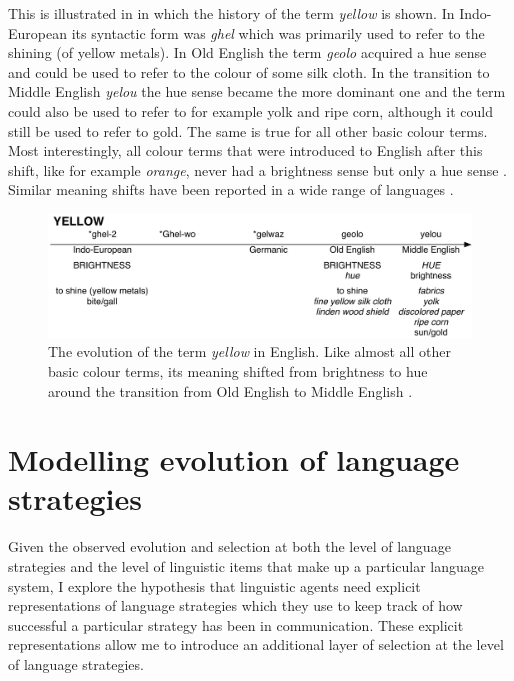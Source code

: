This is illustrated in  in which the
history of the term \textit{yellow} is shown. In Indo-European its
syntactic form was \textit{ghel} which was primarily used to refer to the
shining (of yellow metals). In Old English the term \textit{geolo} acquired
a hue sense and could be used to refer to the colour of some silk
cloth. In the transition to Middle English \textit{yelou} the hue sense
became the more dominant one and the term could also be used to refer
to for example yolk and ripe corn, although it could still be used to
refer to gold. The same is true for all other basic colour terms. Most
interestingly, all colour terms that were introduced to English after
this shift, like for example \textit{orange}, never had a brightness sense
but only a hue sense \citep{casson97shift}. Similar meaning shifts
have been reported in a wide range of languages
\citep{maclaury92brightness}.

\begin{figure}
  \begin{center}
   \includegraphics[width=.8\textwidth]{./intro/figures/history-yellow.pdf}
   \caption[The evolution of the term \textit{yellow} in English]{The
     evolution of the term \textit{yellow} in English. Like almost all
     other basic colour terms, its meaning shifted from brightness to
     hue around the transition from Old English to Middle
     English \citep{casson97shift}.}
    \label{f:history-yellow}
  \end{center}
\end{figure}

\section{Modelling evolution of language strategies}

Given the observed evolution and selection at both the level of
language strategies and the level of linguistic items that make up a
particular language system, I explore the hypothesis that linguistic
agents need explicit representations of language strategies which they
use to keep track of how successful a particular strategy has been in
communication. These explicit representations allow me to introduce an
additional layer of selection at the level of language strategies.

